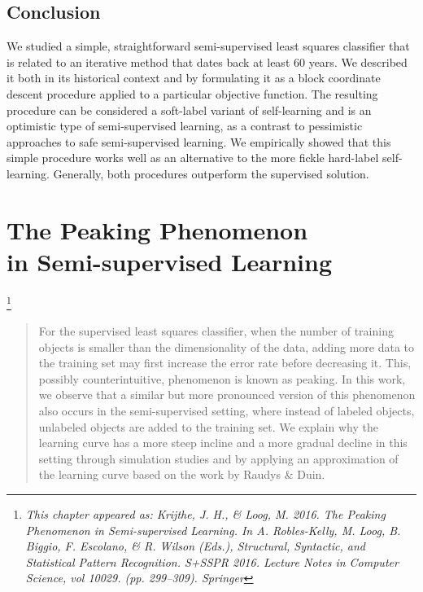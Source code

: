 \documentclass[twoside]{memoir}\usepackage[]{graphicx}\usepackage{xcolor}
\newcommand\blfootnote[1]{%
  \begingroup
  \renewcommand\thefootnote{}\footnote{\itshape#1}%
  \addtocounter{footnote}{-1}%
  \endgroup
}
\begin{document}
\section{Conclusion}
We studied a simple, straightforward semi-supervised least squares classifier that is related to an iterative method that dates back at least 60 years. We described it both in its historical context and by formulating it as a block coordinate descent procedure applied to a particular objective function. The resulting procedure can be considered a soft-label variant of self-learning and is an optimistic type of semi-supervised learning, as a contrast to pessimistic approaches to safe semi-supervised learning. We empirically showed that this simple procedure works well as an alternative to the more fickle hard-label self-learning. Generally, both procedures outperform the supervised solution.

\chapter[The Peaking Phenomenon in Semi-supervised Learning]{The Peaking Phenomenon\\in Semi-supervised Learning}
\label{chapter:peaking}
\blfootnote{This chapter appeared as: Krijthe, J. H., \& Loog, M. 2016. The Peaking Phenomenon in Semi-supervised Learning. In A. Robles-Kelly, M. Loog, B. Biggio, F. Escolano, \& R. Wilson (Eds.), Structural, Syntactic, and Statistical Pattern Recognition. S+SSPR 2016. Lecture Notes in Computer Science, vol 10029. (pp. 299–309). Springer}


\begin{abstract}
For the supervised least squares classifier, when the number of training objects is smaller than the dimensionality of the data, adding more data to the training set may first increase the error rate before decreasing it.  This, possibly counterintuitive, phenomenon is known as peaking. In this work, we observe that a similar but more pronounced version of this phenomenon also occurs in the semi-supervised setting, where instead of labeled objects, unlabeled objects are added to the training set. We explain why the learning curve has a more steep incline and a more gradual decline in this setting through simulation studies and by applying an approximation of the learning curve based on the work by Raudys \& Duin.
\end{abstract}
\end{document}
